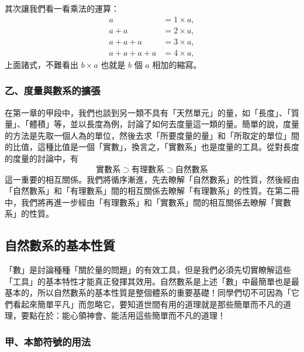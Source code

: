 其次讓我們看一看乘法的運算：
\begin{align*}
  a &= 1 \times a, \\
  a+a &= 2 \times a, \\
  a+a+a &= 3 \times a, \\
  a+a+a+a &= 4 \times a,
\end{align*}
上面諸式，不難看出 $b \times a$ 也就是 $b$ 個 $a$ 相加的縮寫。

\subsubsection*{乙、度量與數系的擴張}\label{subsec:measure_expansion}

在第一章的甲段中，我們也談到另一類不具有「天然單元」的量，如「長度」、「質量」、「體積」等，並以長度為例，討論了如何去度量這一類的量。簡單的說，度量的方法是先取一個人為的單位，然後去求「所要度量的量」和「所取定的單位」間的比值，這種比值是一個「實數」，換言之，「實數系」也是度量的工具。從對長度的度量的討論中，有
\begin{equation*}
  \text{實數系} \supset \text{有理數系} \supset \text{自然數系}
\end{equation*}
這一重要的相互關係。我們將循序漸進，先去瞭解「自然數系」的性質，然後經由「自然數系」和「有理數系」間的相互關係去瞭解「有理數系」的性質。在第二冊中，我們將再進一步經由「有理數系」和「實數系」間的相互關係去瞭解「實數系」的性質。

\subsection{自然數系的基本性質}\label{sec:3-2}

「數」是討論種種「關於量的問題」的有效工具，但是我們必須先切實瞭解這些「工具」的基本特性才能真正發揮其效用。自然數系是上述「數」中最簡單也是最基本的，所以自然數系的基本性質是整個體系的重要基礎！同學們切不可因為「它們看起來簡單平凡」而忽略它，要知道世間有用的道理就是那些簡單而不凡的道理，要點在於：能心領神會、能活用這些簡單而不凡的道理！

\subsubsection*{甲、本節符號的用法}\label{subsec:nat_notation}

